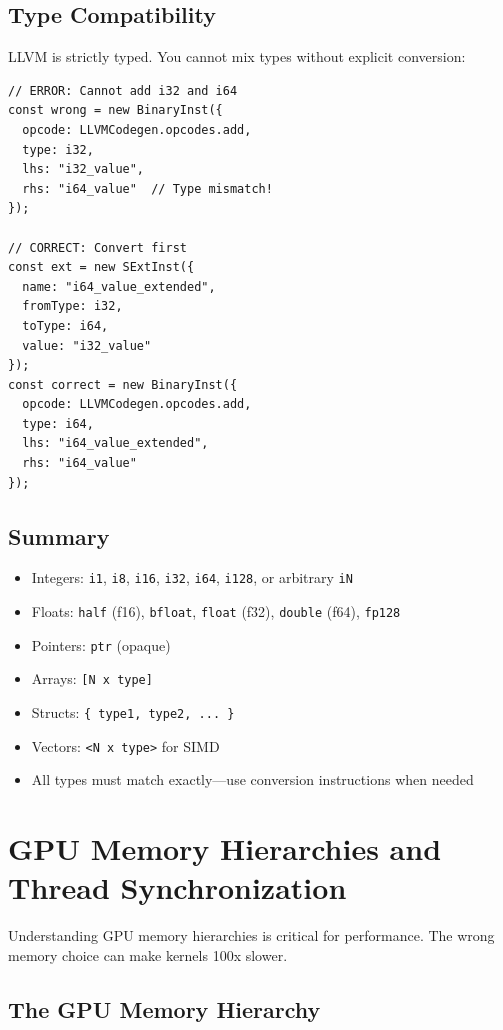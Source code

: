 \documentclass[11pt]{article}
\begin{document}
\subsection{Type Compatibility}

LLVM is strictly typed. You cannot mix types without explicit conversion:

\begin{lstlisting}[style=ts]
// ERROR: Cannot add i32 and i64
const wrong = new BinaryInst({
  opcode: LLVMCodegen.opcodes.add,
  type: i32,
  lhs: "i32_value",
  rhs: "i64_value"  // Type mismatch!
});

// CORRECT: Convert first
const ext = new SExtInst({
  name: "i64_value_extended",
  fromType: i32,
  toType: i64,
  value: "i32_value"
});
const correct = new BinaryInst({
  opcode: LLVMCodegen.opcodes.add,
  type: i64,
  lhs: "i64_value_extended",
  rhs: "i64_value"
});
\end{lstlisting}

\subsection{Summary}

\begin{itemize}[noitemsep]
  \item Integers: \texttt{i1}, \texttt{i8}, \texttt{i16}, \texttt{i32}, \texttt{i64}, \texttt{i128}, or arbitrary \texttt{iN}
  \item Floats: \texttt{half} (f16), \texttt{bfloat}, \texttt{float} (f32), \texttt{double} (f64), \texttt{fp128}
  \item Pointers: \texttt{ptr} (opaque)
  \item Arrays: \texttt{[N x type]}
  \item Structs: \texttt{\{ type1, type2, ... \}}
  \item Vectors: \texttt{<N x type>} for SIMD
  \item All types must match exactly—use conversion instructions when needed
\end{itemize}

\section{GPU Memory Hierarchies and Thread Synchronization}

Understanding GPU memory hierarchies is critical for performance. The wrong memory choice can make kernels 100x slower.

\subsection{The GPU Memory Hierarchy}
\end{document}
